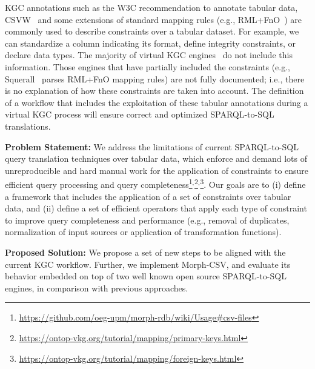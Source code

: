 KGC annotations such as the W3C recommendation to annotate tabular data, CSVW~\citep{tennison2015model} and some extensions of standard mapping rules (e.g., RML+FnO~\citep{de2017declarative}) are commonly used to describe constraints over a tabular dataset. For example, we can standardize a column indicating its format, define integrity constraints, or declare data types. The majority of virtual KGC engines~\citep{priyatna2014formalisation,endris2019ontario} do not include this information. Those engines that have partially included the constraints (e.g., Squerall~\citep{mami2019squerall} parses RML+FnO mapping rules) are not fully documented; i.e., there is no explanation of how these constraints are taken into account. The definition of a workflow that includes the exploitation of these tabular annotations during a virtual KGC process will ensure correct and optimized SPARQL-to-SQL translations.

\noindent\textbf{Problem Statement:} 
We address the limitations of current SPARQL-to-SQL query translation techniques over tabular data, which enforce and demand lots of unreproducible and hard manual work for the application of constraints to ensure efficient query processing and query completeness\footnote{\url{https://github.com/oeg-upm/morph-rdb/wiki/Usage\#csv-files}}$^,$\footnote{\url{https://ontop-vkg.org/tutorial/mapping/primary-keys.html}}$^,$\footnote{\url{https://ontop-vkg.org/tutorial/mapping/foreign-keys.html}}. Our goals are to (i) define a framework that includes the application of a set of constraints over tabular data, and (ii) define a set of efficient operators that apply each type of constraint to improve query completeness and performance (e.g., removal of duplicates, normalization of input sources or application of transformation functions). 

\noindent\textbf{Proposed Solution:} 
We propose a set of new steps to be aligned with the current KGC workflow. Further, we implement Morph-CSV, and evaluate its behavior embedded on top of two well known open source SPARQL-to-SQL engines, in comparison with previous approaches.

